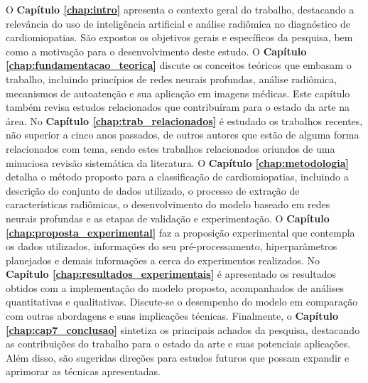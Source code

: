 O \textbf{Capítulo \ref{chap:intro}} apresenta o contexto geral do trabalho, destacando a relevância do uso de inteligência artificial e análise radiômica no diagnóstico de cardiomiopatias. São expostos os objetivos gerais e específicos da pesquisa, bem como a motivação para o desenvolvimento deste estudo. O \textbf{Capítulo \ref{chap:fundamentacao_teorica}} discute os conceitos teóricos que embasam o trabalho, incluindo princípios de redes neurais profundas, análise radiômica, mecanismos de autoatenção e sua aplicação em imagens médicas. Este capítulo também revisa estudos relacionados que contribuíram para o estado da arte na área. No \textbf{Capítulo \ref{chap:trab_relacionados}} é estudado  os trabalhos recentes, não superior a cinco anos passados, de outros autores que estão de alguma forma relacionados com tema, sendo estes trabalhos relacionados oriundos de uma minuciosa revisão sistemática da literatura. O \textbf{Capítulo \ref{chap:metodologia}} detalha o método proposto para a classificação de cardiomiopatias, incluindo a descrição do conjunto de dados utilizado, o processo de extração de características radiômicas, o desenvolvimento do modelo baseado em redes neurais profundas e as etapas de validação e experimentação. O \textbf{Capítulo \ref{chap:proposta_experimental}} faz a proposição experimental que contempla os dados utilizados, informações do seu pré-processamento, hiperparâmetros planejados e demais informações a cerca do experimentos realizados.  No \textbf{Capítulo \ref{chap:resultados_experimentais}} é apresentado os resultados obtidos com a implementação do modelo proposto, acompanhados de análises quantitativas e qualitativas. Discute-se o desempenho do modelo em comparação com outras abordagens e suas implicações técnicas. Finalmente, o \textbf{Capítulo \ref{chap:cap7_conclusao}} sintetiza os principais achados da pesquisa, destacando as contribuições do trabalho para o estado da arte e suas potenciais aplicações. Além disso, são sugeridas direções para estudos futuros que possam expandir e aprimorar as técnicas apresentadas.


